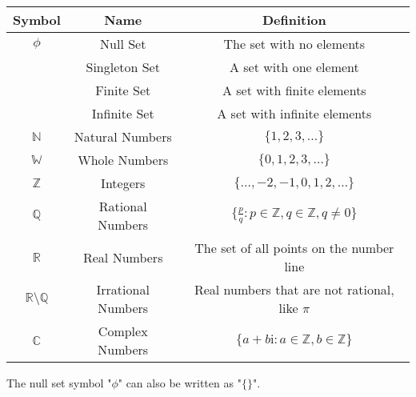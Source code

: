 \begin{tabular}{c|c|c}
	\hline
	Symbol & Name & Definition\\
	\hline
	$\phi$ & Null Set & The set with no elements\\
	 & Singleton Set & A set with one element\\
	 & Finite Set & A set with finite elements\\
	 & Infinite Set & A set with infinite elements\\
	$\mathbb{N}$ & Natural Numbers & $\{1,2,3,\dots\}$\\
	$\mathbb{W}$ & Whole Numbers & $\{0,1,2,3,\dots\}$\\
	$\mathbb{Z}$ & Integers & $\{\dots, -2, -1, 0, 1, 2, \dots\}$\\
	$\mathbb{Q}$ & Rational Numbers &
	$\displaystyle \bigg\{ \frac{p}{q} : p \in \mathbb{Z}, q \in \mathbb{Z}, q \neq 0 \bigg\}$\\
	$\mathbb{R}$ & Real Numbers & The set of all points on the number line\\
	$\mathbb{R}\setminus\mathbb{Q}$ & Irrational Numbers & Real numbers that are not rational, like $\pi$\\
	$\mathbb{C}$ & Complex Numbers & $\{a+b\mathrm{i} : a \in \mathbb{Z}, b \in \mathbb{Z}\}$\\
	\hline
\end{tabular}

\begin{boxnotation*}{}{}
	The null set symbol "$\phi$" can also be written as "$\{\}$".
\end{boxnotation*}

